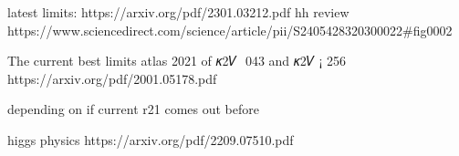 latest limits: https://arxiv.org/pdf/2301.03212.pdf 
hh review 
https://www.sciencedirect.com/science/article/pii/S2405428320300022#fig0002


The current best limits 
atlas 2021 
of 𝜅2𝑉  043 and 𝜅2𝑉 ¡ 256
https://arxiv.org/pdf/2001.05178.pdf 

depending on if current r21 comes out before
    

higgs physics
https://arxiv.org/pdf/2209.07510.pdf 